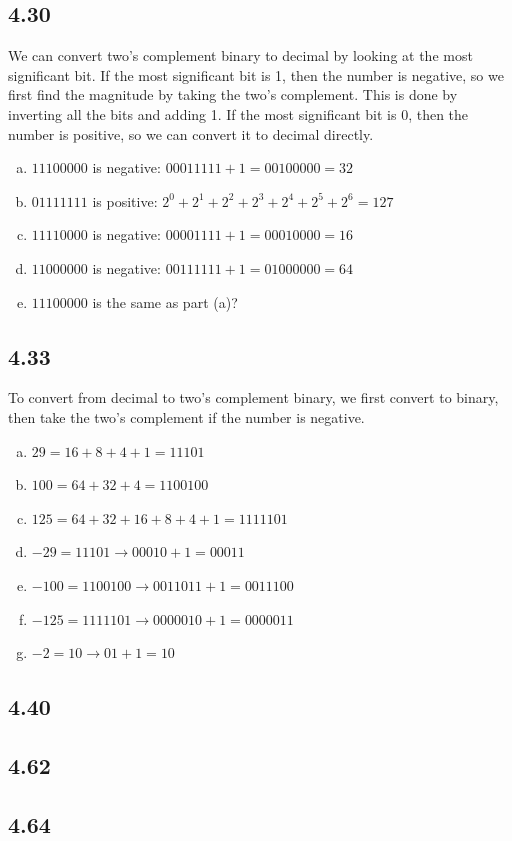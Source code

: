 \documentclass{article}
\begin{document}
\subsection*{4.30}
We can convert two's complement binary to decimal by looking at the most significant bit.
If the most significant bit is 1, then the number is negative, so we first find the magnitude by taking the two's complement.
This is done by inverting all the bits and adding 1.
If the most significant bit is 0, then the number is positive, so we can convert it to decimal directly.
\begin{enumerate}[(a)]
    \item $11100000$ is negative: $00011111 + 1 = 00100000 = 32$
    \item $01111111$ is positive: $2^0 + 2^1 + 2^2 + 2^3 + 2^4 + 2^5 + 2^6 = 127$
    \item $11110000$ is negative: $00001111 + 1 = 00010000 = 16$
    \item $11000000$ is negative: $00111111 + 1 = 01000000 = 64$
    \item $11100000$ is the same as part (a)?
\end{enumerate}

\subsection*{4.33}
To convert from decimal to two's complement binary, we first convert to binary, then take the two's complement if the number is negative.
\begin{enumerate}[(a)]
    \item $29 = 16 + 8 + 4 + 1 = 11101$
    \item $100 = 64 + 32 + 4 = 1100100$
    \item $125 = 64 + 32 + 16 + 8 + 4 + 1 = 1111101$
    \item $-29 = 11101 \rightarrow 00010 + 1 = 00011$
    \item $-100 = 1100100 \rightarrow 0011011 + 1 = 0011100$
    \item $-125 = 1111101 \rightarrow 0000010 + 1 = 0000011$
    \item $-2 = 10 \rightarrow 01 + 1 = 10$
\end{enumerate}

\subsection*{4.40}


\subsection*{4.62}


\subsection*{4.64}
\end{document}
